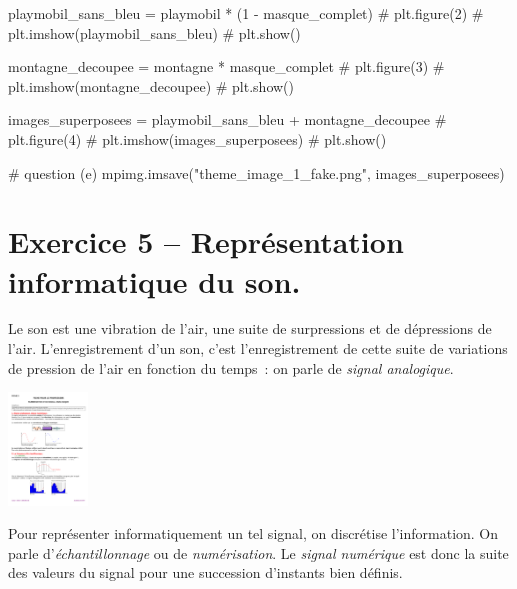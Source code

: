 \documentclass[10pt,fleqn]{article} %
\begin{document}
\begin{multicols}{2}
\begin{corrige}
\begin{python}
playmobil_sans_bleu = playmobil * (1 - masque_complet)
# plt.figure(2)
# plt.imshow(playmobil_sans_bleu)
# plt.show()

montagne_decoupee = montagne * masque_complet
# plt.figure(3)
# plt.imshow(montagne_decoupee)
# plt.show()

images_superposees = playmobil_sans_bleu + montagne_decoupee
# plt.figure(4)
# plt.imshow(images_superposees)
# plt.show()

# question (e)
mpimg.imsave("theme_image_1_fake.png", images_superposees)
\end{python}
\end{corrige}
\else
\fi



\section*{Exercice 5 -- Représentation informatique du son.}

\ifprof
\else
Le son est une vibration de l'air, une suite de surpressions et de
dépressions de l'air. L'enregistrement d'un son, c'est
l'enregistrement de cette suite de variations de pression de l'air en
fonction du temps~: on parle de \emph{signal analogique}.

\centerline{\includegraphics[height=3cm]{images/theme_son_2_fig_1}}

Pour représenter informatiquement un tel signal, on discrétise
l'information. On parle d'\emph{échantillonnage} ou de
\emph{numérisation}. Le \emph{signal numérique} est donc la suite des
valeurs du signal pour une succession d'instants bien définis. 


\end{multicols}
\end{document}

